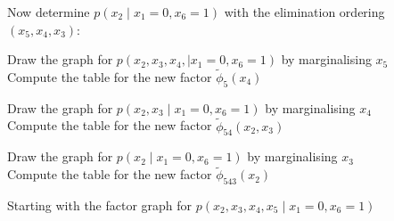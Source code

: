 \begin{exenumerate}
\begin{solution}
  \end{solution}

  \item Now determine $p(x_2 \mid x_1=0, x_6=1)$ with the elimination ordering $(x_5, x_4, x_3)$:

  \begin{exenumerate}
    \item Draw the graph for $p(x_2, x_3, x_4, \mid x_1=0, x_6=1)$ by marginalising $x_5$ \\
    Compute the table for the new factor $\tilde{\phi}_{5}(x_4)$ \\

    \item Draw the graph for $p(x_2, x_3 \mid x_1=0, x_6=1)$ by marginalising $x_4$ \\
    Compute the table for the new factor $\tilde{\phi}_{54}(x_2, x_3)$ \\

    \item Draw the graph for $p(x_2 \mid x_1=0, x_6=1)$ by marginalising $x_3$ \\
      Compute the table for the new factor $\tilde{\phi}_{543}(x_2)$ 
  \end{exenumerate}

  \begin{solution}

    Starting with the factor graph for $p(x_2, x_3, x_4, x_5 \mid x_1=0, x_6=1)$

    \begin{center}
    \end{center}


\end{solution}
\end{exenumerate}
